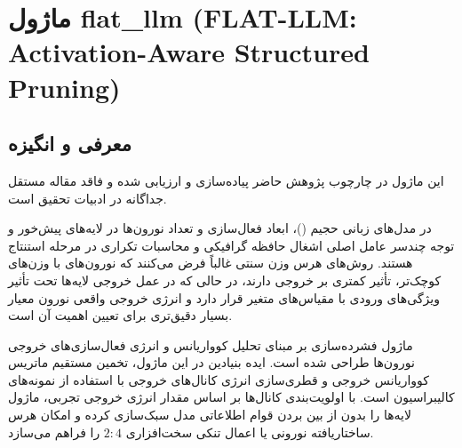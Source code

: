 \section{ماژول flat\_llm (FLAT-LLM: Activation-Aware Structured Pruning)}
\label{sec:module_flat_llm}

\subsection{معرفی و انگیزه}
این ماژول در چارچوب پژوهش حاضر پیاده‌سازی و ارزیابی شده و فاقد مقاله مستقل جداگانه در ادبیات تحقیق است.

در مدل‌های زبانی حجیم ()، ابعاد فعال‌سازی و تعداد نورون‌ها در لایه‌های پیش‌خور و توجه چندسر عامل اصلی اشغال حافظه گرافیکی و محاسبات تکراری در مرحله استنتاج هستند. روش‌های هرس وزن سنتی غالباً فرض می‌کنند که نورون‌های با وزن‌های کوچک‌تر، تأثیر کمتری بر خروجی دارند، در حالی که در عمل خروجی لایه‌ها تحت تأثیر ویژگی‌های ورودی با مقیاس‌های متغیر قرار دارد و انرژی خروجی واقعی نورون معیار بسیار دقیق‌تری برای تعیین اهمیت آن است.

ماژول فشرده‌سازی  بر مبنای تحلیل کوواریانس و انرژی فعال‌سازی‌های خروجی نورون‌ها طراحی شده است. ایده بنیادین در این ماژول، تخمین مستقیم ماتریس کوواریانس خروجی و قطری‌سازی انرژی کانال‌های خروجی با استفاده از نمونه‌های کالیبراسیون است. با اولویت‌بندی کانال‌ها بر اساس مقدار انرژی خروجی تجربی، ماژول لایه‌ها را بدون از بین بردن قوام اطلاعاتی مدل سبک‌سازی کرده و امکان هرس ساختاریافته نورونی یا اعمال تنکی سخت‌افزاری $2:4$ را فراهم می‌سازد.


